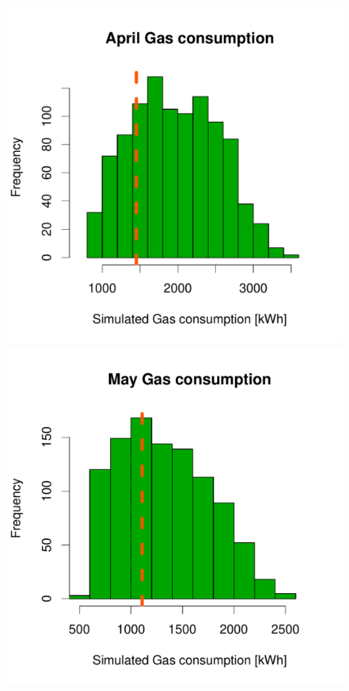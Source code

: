 \documentclass[a4paper, 12pt]{article}
\begin{document}
\begin{figure}
 \includegraphics[width=\scale]{Simulation_histograms/Batch_2_Only/April_Gas}
 \includegraphics[width=\scale]{Simulation_histograms/Batch_2_Only/May_Gas}

\end{figure}
\end{document}
